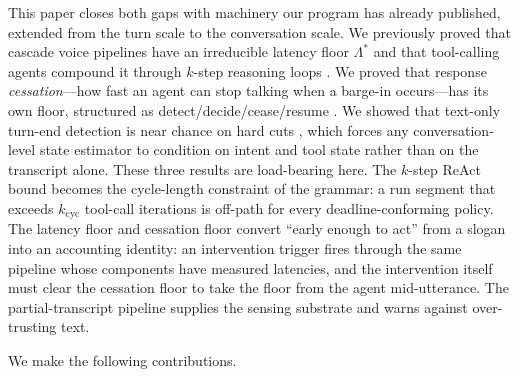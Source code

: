 This paper closes both gaps with machinery our program has already published,
extended from the turn scale to the conversation scale.
We previously proved that cascade voice pipelines have an irreducible latency floor
$\Lambda^*$ and that tool-calling agents compound it through $k$-step reasoning loops \citep{garcia2026latencyfloor}.
We proved that response \emph{cessation}---how fast an agent can stop talking when a
barge-in occurs---has its own floor, structured as detect/decide/cease/resume \citep{garcia2026cessationfloor}.
We showed that text-only turn-end detection is near chance on hard cuts
\citep{garcia2026asking}, which forces any conversation-level state estimator to condition
on intent and tool state rather than on the transcript alone.
These three results are load-bearing here.
The $k$-step ReAct bound \citep{yao2023react} becomes the cycle-length constraint of the grammar:
a run segment that exceeds $k_{\mathrm{cyc}}$ tool-call iterations is off-path for every
deadline-conforming policy.
The latency floor and cessation floor convert ``early enough to act'' from a slogan
into an accounting identity: an intervention trigger fires through the same pipeline
whose components have measured latencies, and the intervention itself must clear
the cessation floor to take the floor from the agent mid-utterance.
The partial-transcript pipeline supplies the sensing substrate and warns against over-trusting text.

We make the following contributions.


